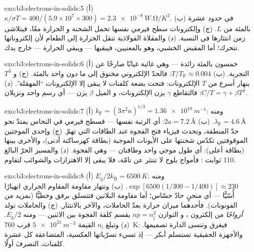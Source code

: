 \begin{solution}{exo:b3:electrons-in-solids:5}
(أ) $\kappa/\sigma T = 400/(5.9\times10^7\times300) =
\qty{2.3e-8}{W.\ohm/K^2}$. (ب) في حدود عشرة بالمئة من $L$. (ج)
وإلكترونات سطح فيرمي نفسها تحمل الشحنة و
الحرارة معًا، فيتلاشى زمن انتثارها في النسبة. (د) والمقلاة
الفولاذية تنقل الحرارة إلى الطعام لأن إلكتروناتها تتحرك؛
أما المقبض الخشبي، وهو  بالمعنيين، فيبقيها ---
ويبقي الحرارة --- خارج يدك.
\end{solution}

\begin{solution}{exo:b3:electrons-in-solids:6}
(أ) خمسون بالمئة زائدة --- وهي غائبة غيابًا صارخًا عن التجربة.
(ب) $T/T_{\text{F}} \approx 0.004$: فالحدّ الإلكتروني
مخنوق إلى ما دون واحد بالمئة. (ج) و $T^3$  ينهار
أسرع من $T$ الإلكترونات: فتحت بضعة كلفنات لا يبقى إلا
الإلكترونات ``المهمَلة''. (د) $C/T =
\gamma + \beta T^2$: فالتقاطع $\gamma$ يزن الإلكترونات، و
الميل $\beta$ يزن  --- أي رسم واحد ونزيلان.
\end{solution}

\begin{solution}{exo:b3:electrons-in-solids:7}
(أ) $k_{\text{F}} = (3\pi^2n)^{1/3} = \qty{1.36e10}{m^{-1}}$:
ومنه $\lambda_{\text{F}} = \qty{4.6}{\angstrom}$. (ب) $2a =
\qty{7.2}{\angstrom}$: أي الرتبة نفسها --- فسطح فيرمي في النحاس
يمتدّ نحو حدّ المنطقة، وتحدث فيزياء فتح الفجوة
\emph{عند} الطاقات التي تهمّ. (ج) وإحدى الموجتين الموقوفتين
تكدّس شحنتها على الأيونات الموجبة (بطاقة كهرساكنة أدنى)، والأخرى
بينها (بطاقة أعلى): أي طول موجي واحد وطاقتان
--- وهي الفجوة. (د) والمسير الحرّ البالغ 110 ثوابت :
فأمواج بلوخ لا تنتثر عن  تامّة، فلا يبقى إلا
الاهتزازات والشوائب لتقاوم.
\end{solution}

\begin{solution}{exo:b3:electrons-in-solids:8}
(أ) $E_{\text{g}}/2k_{\text{B}} = \qty{6500}{K}$:
ومنه $\exp[6500(1/300 - 1/400)] \approx 230$. (ب) وتنهار
مقاومة المقاوم الحراري انهيارًا أُسّيًّا --- أي منحنٍ حادّ حسّاس؛
أما مقاومة البلاتين فتتسلق برفق وخطيًّا (بمزيد من الفونونات). فأحدهما
ميزان حرارة بعدّ الحاملات، والآخر بالانتثار. (ج)
والحاملات تولد \emph{أزواجًا} من إلكترون ، و
التوازن $np = n_{\text{i}}^2$ يقسم كلفة الفجوة بين
الاثنين --- ومنه $E_{\text{g}}/2$. (د)
وتبلغ $n_{\text{i}}$ القيمة $\qty{5e21}{m^{-3}}$ قرب \qty{760}{K}:
فيغرق  وتنسى الدارة تصميمها. والأجهزة
الحقيقية تستسلم أبكر --- إذ تسيء تسرّباتها العكسية، المتضاعفة كل
عشرة كلفنات، التصرفَ أولًا.
\end{solution}

